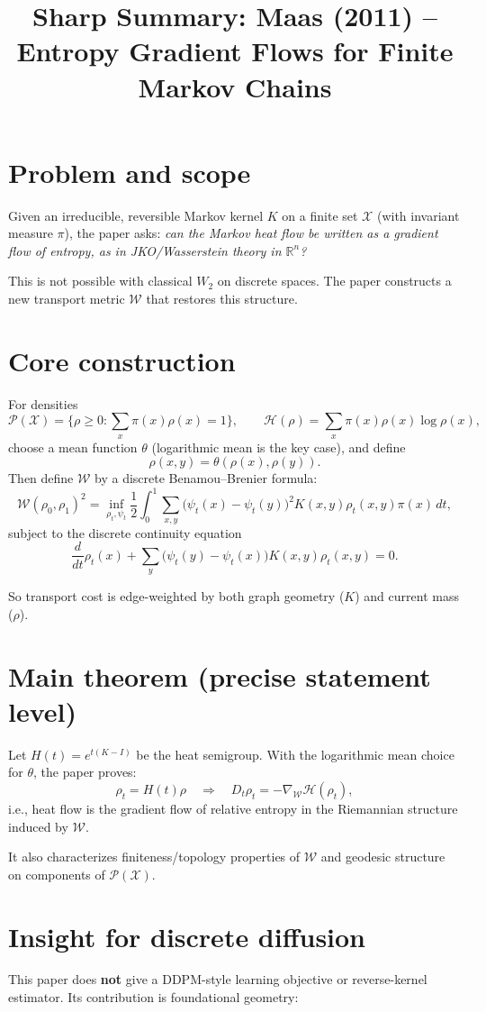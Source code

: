 \documentclass[11pt]{article}
\title{Sharp Summary: Maas (2011) -- Entropy Gradient Flows for Finite Markov Chains}
\author{}
\date{}
\begin{document}
\maketitle

\section*{Problem and scope}
Given an irreducible, reversible Markov kernel $K$ on a finite set $\mathcal X$ (with invariant measure $\pi$), the paper asks:
\emph{can the Markov heat flow be written as a gradient flow of entropy, as in JKO/Wasserstein theory in $\mathbb R^n$?}

This is not possible with classical $W_2$ on discrete spaces. The paper constructs a new transport metric $\mathcal W$ that restores this structure.

\section*{Core construction}
For densities
\[
\mathcal P(\mathcal X)=\Big\{\rho\ge 0:\sum_x \pi(x)\rho(x)=1\Big\},
\qquad
\mathcal H(\rho)=\sum_x \pi(x)\rho(x)\log\rho(x),
\]
choose a mean function $\theta$ (logarithmic mean is the key case), and define
\[
\rho(x,y)=\theta(\rho(x),\rho(y)).
\]
Then define $\mathcal W$ by a discrete Benamou--Brenier formula:
\[
\mathcal W(\rho_0,\rho_1)^2
=\inf_{\rho_t,\psi_t}
\frac12\int_0^1\sum_{x,y}\big(\psi_t(x)-\psi_t(y)\big)^2 K(x,y)\rho_t(x,y)\pi(x)\,dt,
\]
subject to the discrete continuity equation
\[
\frac{d}{dt}\rho_t(x)
+\sum_y\big(\psi_t(y)-\psi_t(x)\big)K(x,y)\rho_t(x,y)=0.
\]

So transport cost is edge-weighted by both graph geometry ($K$) and current mass ($\rho$).

\section*{Main theorem (precise statement level)}
Let $H(t)=e^{t(K-I)}$ be the heat semigroup. With the logarithmic mean choice for $\theta$, the paper proves:
\[
\rho_t = H(t)\rho
\quad\Longrightarrow\quad
D_t\rho_t = -\nabla_{\mathcal W}\mathcal H(\rho_t),
\]
i.e., heat flow is the gradient flow of relative entropy in the Riemannian structure induced by $\mathcal W$.

It also characterizes finiteness/topology properties of $\mathcal W$ and geodesic structure on components of $\mathcal P(\mathcal X)$.

\section*{Insight for discrete diffusion}
This paper does \textbf{not} give a DDPM-style learning objective or reverse-kernel estimator. Its contribution is foundational geometry:
\end{document}
